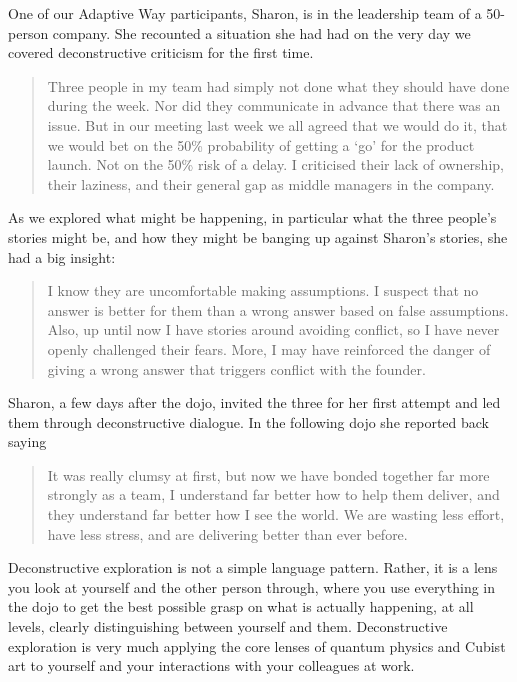 \begin{longstoryblock}
One of our Adaptive Way  participants, Sharon, is in the leadership team of a 50-person company. She recounted a situation she had had on the very day we covered deconstructive criticism for the first time.


\begin{quote}Three people in my team had simply not done what they should have done during the week. Nor did they communicate in advance that there was an issue. But in our meeting last week we all agreed that we would do it, that we would bet on the 50\% probability of getting a ‘go’ for the product launch. Not on the 50\% risk of a delay. I criticised their lack of ownership, their laziness, and their general gap as middle managers in the company.\end{quote}


As we explored what might be happening, in particular what the three people’s stories might be, and how they might be banging up against Sharon's stories, she had a big insight: \begin{quote}I know they are uncomfortable making assumptions. I suspect that no answer is better for them than a wrong answer based on false assumptions. Also, up until now I have stories around avoiding conflict, so I have never openly challenged their fears. More, I may have reinforced the danger of giving a wrong answer that triggers conflict with the founder.\end{quote}


Sharon, a few days after the dojo, invited the three for her first attempt and led them  through deconstructive dialogue. In the following dojo she reported back saying \begin{quote}It was really clumsy at first, but now we have bonded together far more strongly as a team, I understand far better how to help them deliver, and they understand far better how I see the world. We are wasting less effort, have less stress, and are delivering better than ever before.\end{quote}
\end{longstoryblock}


Deconstructive exploration is not a simple language pattern. Rather, it is a lens you look at yourself and the other person through, where you use everything in the dojo to get the best possible grasp on what is actually happening, at all levels, clearly distinguishing between yourself and them. Deconstructive exploration is very much applying the core lenses of quantum physics and Cubist art  to yourself and your interactions with your colleagues at work.   


